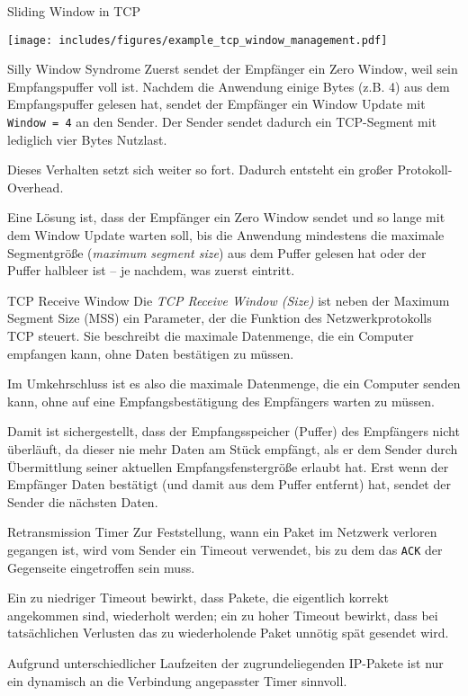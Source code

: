 \begin{example}{Sliding Window in TCP}
    \begin{center}
        \texttt{[image: includes/figures/example\_tcp\_window\_management.pdf]}
    \end{center}
\end{example}

\begin{bonus}{Silly Window Syndrome}
    Zuerst sendet der Empfänger ein Zero Window, weil sein Empfangspuffer voll ist.
    Nachdem die Anwendung einige Bytes (z.B. 4) aus dem Empfangspuffer gelesen hat, sendet der Empfänger ein Window Update mit \texttt{Window = 4} an den Sender.
    Der Sender sendet dadurch ein TCP-Segment mit lediglich vier Bytes Nutzlast.

    Dieses Verhalten setzt sich weiter so fort. Dadurch entsteht ein großer Protokoll-Overhead.

    Eine Lösung ist, dass der Empfänger ein Zero Window sendet und so lange mit dem Window Update warten soll, bis die Anwendung mindestens die maximale Segmentgröße (\emph{maximum segment size}) aus dem Puffer gelesen hat oder der Puffer halbleer ist – je nachdem, was zuerst eintritt.
\end{bonus}

\begin{defi}{TCP Receive Window}
    Die \emph{TCP Receive Window (Size)} ist neben der Maximum Segment Size (MSS) ein Parameter, der die Funktion des Netzwerkprotokolls TCP steuert.
    Sie beschreibt die maximale Datenmenge, die ein Computer empfangen kann, ohne Daten bestätigen zu müssen.

    Im Umkehrschluss ist es also die maximale Datenmenge, die ein Computer senden kann, ohne auf eine Empfangsbestätigung des Empfängers warten zu müssen.

    Damit ist sichergestellt, dass der Empfangsspeicher (Puffer) des Empfängers nicht überläuft, da dieser nie mehr Daten am Stück empfängt, als er dem Sender durch Übermittlung seiner aktuellen Empfangsfenstergröße erlaubt hat.
    Erst wenn der Empfänger Daten bestätigt (und damit aus dem Puffer entfernt) hat, sendet der Sender die nächsten Daten.
\end{defi}

\begin{bonus}{Retransmission Timer}
    Zur Feststellung, wann ein Paket im Netzwerk verloren gegangen ist, wird vom Sender ein Timeout verwendet, bis zu dem das \texttt{ACK} der Gegenseite eingetroffen sein muss.

    Ein zu niedriger Timeout bewirkt, dass Pakete, die eigentlich korrekt angekommen sind, wiederholt werden; ein zu hoher Timeout bewirkt, dass bei tatsächlichen Verlusten das zu wiederholende Paket unnötig spät gesendet wird.

    Aufgrund unterschiedlicher Laufzeiten der zugrundeliegenden IP-Pakete ist nur ein dynamisch an die Verbindung angepasster Timer sinnvoll.
\end{bonus}